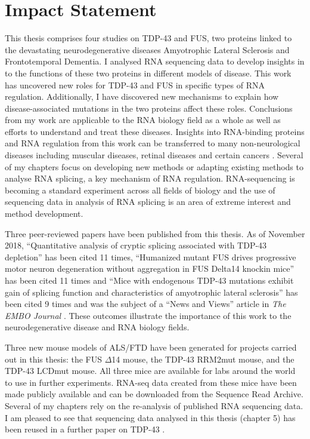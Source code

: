 
\cleardoublepage

\section*{Impact Statement}

This thesis comprises four studies on TDP-43 and FUS, two proteins linked to the devastating neurodegenerative diseases Amyotrophic Lateral Sclerosis and Frontotemporal Dementia.
I analysed RNA sequencing data to develop insights in to the functions of these two proteins in different models of disease.
This work has uncovered new roles for TDP-43 and FUS in specific types of RNA regulation.
Additionally, I have discovered new mechanisms to explain how disease-associated mutations in the two proteins affect these roles.
Conclusions from my work are applicable to the RNA biology field as a whole as well as efforts to understand and treat these diseases.
Insights into RNA-binding proteins and RNA regulation from this work can be transferred to many non-neurological diseases including muscular diseases, retinal diseases and certain cancers \citep{Scotti2015}. 
Several of my chapters focus on developing new methods or adapting existing methods to analyse RNA splicing, a key mechanism of RNA regulation.
RNA-sequencing is becoming a standard experiment across all fields of biology and the use of sequencing data in analysis of RNA splicing is an area of extreme interest and method development. 

Three peer-reviewed papers have been published from this thesis.
As of November 2018, ``Quantitative analysis of cryptic splicing associated with TDP-43 depletion'' \citep{Humphrey2017} has been cited 11 times, ``Humanized mutant FUS drives progressive motor neuron degeneration without aggregation in FUS Delta14 knockin mice'' \citep{Devoy2017} has been cited 11 times and ``Mice with endogenous TDP-43 mutations exhibit gain of splicing function and characteristics of amyotrophic lateral sclerosis'' \citep{Fratta2018} has been cited 9 times and was the subject of a ``News and Views'' article in \textit{The EMBO Journal} \citep{Rouaux2018}.
These outcomes illustrate the importance of this work to the neurodegenerative disease and RNA biology fields.

Three new mouse models of ALS/FTD have been generated for projects carried out in this thesis: the FUS $\Delta$14 mouse, the TDP-43 RRM2mut mouse, and the TDP-43 LCDmut mouse. 
All three mice are available for labs around the world to use in further experiments.
RNA-seq data created from these mice have been made publicly available and can be downloaded from the Sequence Read Archive\footnotemark.
Several of my chapters rely on the re-analysis of published RNA sequencing data. 
I am pleased to see that sequencing data analysed in this thesis (chapter 5) has been reused in a further paper on TDP-43 \citep{Sivakumar2018}.

